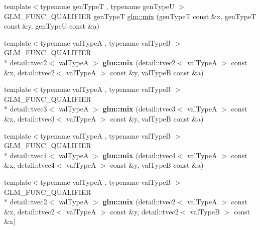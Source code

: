 \begin{DoxyCompactItemize}
\item 
{\footnotesize template$<$typename gen\-Type\-T , typename gen\-Type\-U $>$ }\\G\-L\-M\-\_\-\-F\-U\-N\-C\-\_\-\-Q\-U\-A\-L\-I\-F\-I\-E\-R gen\-Type\-T \hyperlink{group__core__func__common_ga3f64b3986efe205cf30300700667e761}{glm\-::mix} (gen\-Type\-T const \&x, gen\-Type\-T const \&y, gen\-Type\-U const \&a)
\item 
\hypertarget{namespaceglm_a8b1d3fcc61437749e04c3180ab5dc5cb}{{\footnotesize template$<$typename val\-Type\-A , typename val\-Type\-B $>$ }\\G\-L\-M\-\_\-\-F\-U\-N\-C\-\_\-\-Q\-U\-A\-L\-I\-F\-I\-E\-R \\*
detail\-::tvec2$<$ val\-Type\-A $>$ {\bfseries glm\-::mix} (detail\-::tvec2$<$ val\-Type\-A $>$ const \&x, detail\-::tvec2$<$ val\-Type\-A $>$ const \&y, val\-Type\-B const \&a)}\label{namespaceglm_a8b1d3fcc61437749e04c3180ab5dc5cb}

\item 
\hypertarget{namespaceglm_abaf29c996e52b2aea7b9f48d32cb088e}{{\footnotesize template$<$typename val\-Type\-A , typename val\-Type\-B $>$ }\\G\-L\-M\-\_\-\-F\-U\-N\-C\-\_\-\-Q\-U\-A\-L\-I\-F\-I\-E\-R \\*
detail\-::tvec3$<$ val\-Type\-A $>$ {\bfseries glm\-::mix} (detail\-::tvec3$<$ val\-Type\-A $>$ const \&x, detail\-::tvec3$<$ val\-Type\-A $>$ const \&y, val\-Type\-B const \&a)}\label{namespaceglm_abaf29c996e52b2aea7b9f48d32cb088e}

\item 
\hypertarget{namespaceglm_aefbc532fc3609f5f39a15d85f3afc442}{{\footnotesize template$<$typename val\-Type\-A , typename val\-Type\-B $>$ }\\G\-L\-M\-\_\-\-F\-U\-N\-C\-\_\-\-Q\-U\-A\-L\-I\-F\-I\-E\-R \\*
detail\-::tvec4$<$ val\-Type\-A $>$ {\bfseries glm\-::mix} (detail\-::tvec4$<$ val\-Type\-A $>$ const \&x, detail\-::tvec4$<$ val\-Type\-A $>$ const \&y, val\-Type\-B const \&a)}\label{namespaceglm_aefbc532fc3609f5f39a15d85f3afc442}

\item 
\hypertarget{namespaceglm_a7f7ea14c70ee0608b408eed45f1e5540}{{\footnotesize template$<$typename val\-Type\-A , typename val\-Type\-B $>$ }\\G\-L\-M\-\_\-\-F\-U\-N\-C\-\_\-\-Q\-U\-A\-L\-I\-F\-I\-E\-R \\*
detail\-::tvec2$<$ val\-Type\-A $>$ {\bfseries glm\-::mix} (detail\-::tvec2$<$ val\-Type\-A $>$ const \&x, detail\-::tvec2$<$ val\-Type\-A $>$ const \&y, detail\-::tvec2$<$ val\-Type\-B $>$ const \&a)}\label{namespaceglm_a7f7ea14c70ee0608b408eed45f1e5540}


\end{DoxyCompactItemize}
